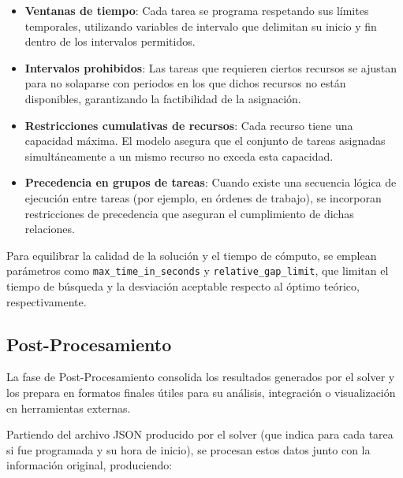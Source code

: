 \documentclass{article}
\begin{document}
\begin{itemize}
    \item \textbf{Ventanas de tiempo}: Cada tarea se programa respetando sus límites temporales, utilizando variables de intervalo que delimitan su inicio y fin dentro de los intervalos permitidos.
    
    \item \textbf{Intervalos prohibidos}: Las tareas que requieren ciertos recursos se ajustan para no solaparse con periodos en los que dichos recursos no están disponibles, garantizando la factibilidad de la asignación.

    \item \textbf{Restricciones cumulativas de recursos}: Cada recurso tiene una capacidad máxima. El modelo asegura que el conjunto de tareas asignadas simultáneamente a un mismo recurso no exceda esta capacidad.

    \item \textbf{Precedencia en grupos de tareas}: Cuando existe una secuencia lógica de ejecución entre tareas (por ejemplo, en órdenes de trabajo), se incorporan restricciones de precedencia que aseguran el cumplimiento de dichas relaciones.

\end{itemize}

Para equilibrar la calidad de la solución y el tiempo de cómputo, se emplean parámetros como \texttt{max\_time\_in\_seconds} y \texttt{relative\_gap\_limit}, que limitan el tiempo de búsqueda y la desviación aceptable respecto al óptimo teórico, respectivamente.


\subsection{Post-Procesamiento}

La fase de Post-Procesamiento consolida los resultados generados por el solver y los prepara en formatos finales útiles para su análisis, integración o visualización en herramientas externas.

Partiendo del archivo JSON producido por el solver (que indica para cada tarea si fue programada y su hora de inicio), se procesan estos datos junto con la información original, produciendo:
\end{document}
